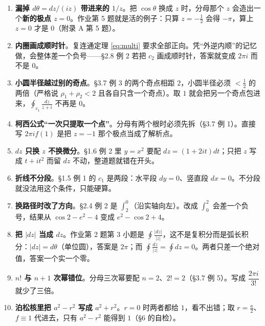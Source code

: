 
\begin{enumerate}[label=\textbf{\arabic*.}]
\item \textbf{漏掉 $d\theta=dz/(iz)$ 带进来的 $1/z$}。把 $\cos\theta$ 换成 $z$ 时，分母那个 $z$ 会造出一个\textbf{新的极点 $z=0$}。作业第 5 题就是活的例子：只算 $z=-\tfrac12$ 会得 $-\pi$，算上 $z=0$ 才是 $0$（附录 A 第 5 题）。

\item \textbf{内圈画成顺时针}。复连通定理 \eqref{eq:multi} 要求全部正向。凭“外逆内顺”的记忆做，会整体差一个负号——§2.8 例 2 若把 $c_2$ 画成顺时针，答案就变成 $2\pi i$ 而不是 $0$。

\item \textbf{小圆半径越过别的奇点}。§3.7 例 3 的两个奇点相距 $2$，小圆半径必须 $<\tfrac12$ 的两倍（严格说 $\rho_1+\rho_2<2$ 且各自只含一个奇点）。取 $1$ 就会把另一个奇点包进来，$\oint_{c_1}\frac{dz}{z+i}$ 不再是 $0$。

\item \textbf{柯西公式“一次只提取一个点”}。分母有两个根时必须先拆（§3.7 例 1）。直接写 $2\pi i f(1)$ 是把 $z=-1$ 那个极点当成了解析点。

\item \textbf{$dz$ 只换 $z$ 不换微分}。§1.6 例 2 里 $y=x^{2}$ 要配 $dz=(1+2it)dt$；只把 $z$ 写成 $t+it^{2}$ 而留 $dz$ 不动，整道题就错在开头。

\item \textbf{折线不分段}。§1.5 例 1 的 $c_1$ 是两段：水平段 $dy=0$、竖直段 $dx=0$。不分段就没法用这个条件，只能硬算。

\item \textbf{换路径时改了方向}。§2.4 例 2 是 $\int_2^0$（沿实轴向左）。改成 $\int_0^2$ 会差一个负号，结果从 $\cos2-e^{2}-4$ 变成 $e^{2}-\cos2+4$。

\item \textbf{把 $|dz|$ 当成 $dz$}。作业第 2 题第 3 小题是 $\oint\frac{|dz|}{|z|}$，这不是复积分而是弧长积分：$|dz|=d\theta$（单位圆），答案是 $2\pi$；而 $\oint\frac{dz}{|z|}=\oint dz=0$。两者只差一个绝对值，答案一个实一个零。

\item \textbf{$n!$ 与 $n+1$ 次幂错位}。分母三次幂要配 $n=2$、$2!=2$（§3.7 例 5）。写成 $\dfrac{2\pi i}{3!}$ 就少了三倍。

\item \textbf{泊松核里把 $a^{2}-r^{2}$ 写成 $a^{2}+r^{2}$}。$r=0$ 时两者都给 $1$，看不出错；取 $r=\tfrac{a}{2}$、$f\equiv1$ 代进去，只有 $a^{2}-r^{2}$ 能得到 $1$（§6 的自检）。
\end{enumerate}

